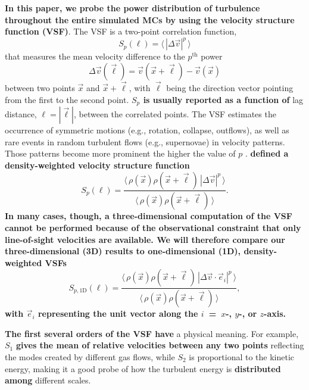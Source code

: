 \textbf{In this paper, we probe the power distribution of turbulence throughout the entire simulated MCs by using the velocity structure function (VSF)}.
The VSF is a two-point correlation function,
\begin{equation}
	{S}_p (\ell) = \langle \, |\Delta \vec{v}|^p  \, \rangle
    \label{equ:method:def_vsf}
\end{equation}
that measures the mean velocity difference to the $p^\mathrm{th}$ power
\begin{equation}\Delta \vec{v} (\vec{\ell}) = \vec{v}(\vec{x}+\vec{\ell}) - \vec{v}(\vec{x})
\end{equation} 
between two points $\vec{x}$ and $\vec{x}+\vec{\ell}$, with $\vec{\ell}$ being the direction vector pointing from the first to the second point.  
\textbf{$S_p$ is usually reported as a function of} lag distance, $\ell = |\vec{\ell}|$, between the correlated points.
The VSF estimates the occurrence of symmetric motions (e.g., rotation, collapse, outflows), as well as rare events in random turbulent flows (e.g., supernovae) in velocity patterns.
Those patterns become more prominent the higher the value of $p$ \citep{Heyer2004}.
\textbf{\citet{Padoan2016a} defined a density-weighted velocity structure function}
\begin{equation}
	{S}_p (\ell) = \frac{\langle \, \rho(\vec{x}) \rho(\vec{x}+\vec{\ell}) \, |\Delta \vec{v}|^p  \, \rangle}{\langle  \, \rho(\vec{x}) \rho(\vec{x}+\vec{\ell}) \, \rangle}.
    \label{equ:method:def_vsf_dw}
\end{equation}
\textbf{In many cases, though, a three-dimensional computation of the VSF cannot be performed because of the observational constraint that only line-of-sight velocities are available.
We will therefore compare our three-dimensional (3D) results to one-dimensional (1D), density-weighted VSFs}
\begin{equation}
	\mathit{S}_{p,\mathrm{1D}} (\ell) = \frac{\langle \, \rho(\vec{x}) \rho(\vec{x}+\vec{\ell}) \, |\Delta 
        \vec{v} \cdot \vec{e}_i|^p  \, \rangle}{\langle  \, \rho(\vec{x}) \rho(\vec{x}+\vec{\ell}) \, \rangle} ,
	\label{equ:results:def_vsf_1d}
\end{equation}
\textbf{with $\vec{e}_i$ representing the unit vector along the $i$~=~$x$-, $y$-, or $z$-axis.}

\textbf{The first several orders of the VSF have} a physical meaning. 
For example, $\mathit{S}_1$ \textbf{gives the mean of relative velocities between any two points} reflecting the modes created by different gas flows, while $\mathit{S}_2$ is proportional to the kinetic energy, making it a good probe of how the turbulent energy is \textbf{distributed among} different scales.

